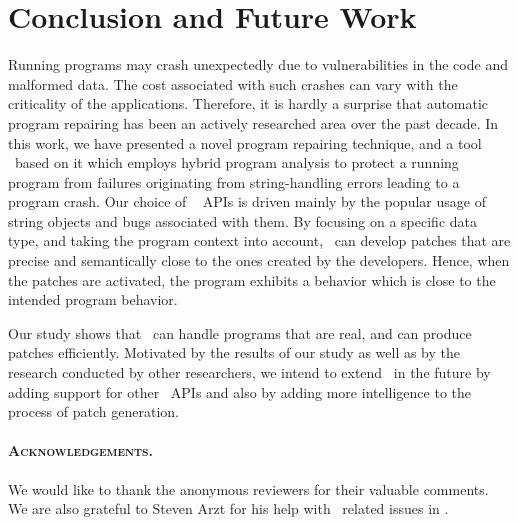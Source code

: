 \section{Conclusion and Future Work}
\label{sec:conc}

Running programs may crash unexpectedly due to vulnerabilities in the code and
malformed data.
The cost associated with such crashes can vary with the criticality of the
applications. Therefore, it is hardly a surprise that automatic program
repairing has been an actively researched area over the past decade.
In this work, we have presented a novel program repairing technique, and a tool
\tool\ based on it which employs hybrid program analysis to protect a running
program from failures originating from string-handling errors leading to a
program crash.
Our choice of \java\  APIs is driven mainly by the popular usage of
string objects and bugs associated with them.
By focusing on a specific data type, and taking the program context into
account, \tool\ can develop patches that are precise and  semantically close to
the ones created by the developers.
Hence, when the patches are activated, the program exhibits a behavior which is
close to the intended program behavior.

Our study shows that \tool\ can handle programs that are real, and can produce
patches efficiently. Motivated by the results of our study as well as by the
research conducted by other researchers, we intend to extend \tool\ in the
future by adding support for other \java\ APIs and also by adding more
intelligence to the process of patch generation.

\paragraph{\textsc{Acknowledgements.}}
We would like to thank the anonymous reviewers for their valuable comments. We
are also grateful to Steven Arzt for his help with \soot\ related issues in
\tool.
